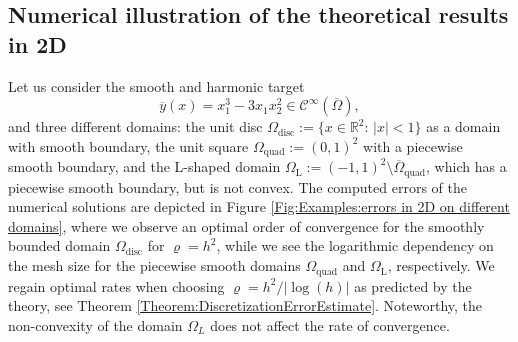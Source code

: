 \documentclass{article}
\numberwithin{equation}{section}
\begin{document}
\subsection{Numerical illustration of the theoretical results in 2D}
\label{Subsec:NumericalResults:DomainRegularity}
Let us consider the smooth and harmonic target 
\begin{equation}\label{Eqn:Examples:harmonic-smooth-2D}
  \overline{y}(x) = x_1^3-3x_1x_2^2 \in \mathcal{C}^\infty (\overline{\Omega}),
\end{equation}
and three different domains: the unit disc
$\Omega_{\text{disc}} :=\{ x \in\mathbb{R}^2:\, |x| <1\}$
as a domain with smooth boundary, the unit square
$\Omega_{\text{quad}} := (0,1)^2$ with a piecewise smooth boundary, and the
L-shaped domain $\Omega_{\text{L}} := (-1,1)^2\setminus
\overline{\Omega}_{\text{quad}}$,
which has a piecewise smooth boundary, but is not convex. The computed errors
of the numerical solutions are depicted in
Figure \ref{Fig:Examples:errors in 2D on different domains}, where we observe
an optimal order of convergence for the smoothly bounded domain
$\Omega_{\text{disc}}$ for $\varrho = h^2$, while we see the logarithmic
dependency on the mesh size for the piecewise smooth domains
$\Omega_{\text{quad}}$ and $\Omega_{\text{L}}$, respectively. We regain
optimal rates when choosing $\varrho = h^2/|\log(h)|$ as predicted by
the theory, see Theorem \ref{Theorem:DiscretizationErrorEstimate}.
Noteworthy, the non-convexity of the domain $\Omega_L$ does not affect
the rate of convergence.
\end{document}
